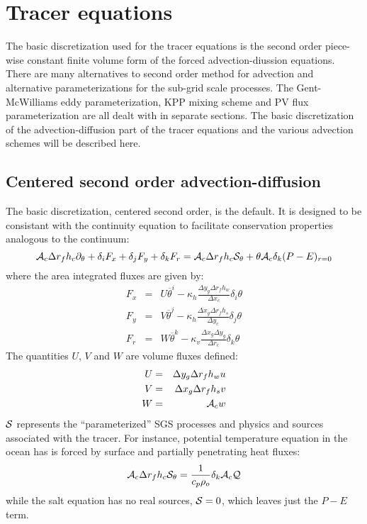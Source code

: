 
\section{Tracer equations}

The basic discretization used for the tracer equations is the second
order piece-wise constant finite volume form of the forced
advection-diussion equations. There are many alternatives to second
order method for advection and alternative parameterizations for the
sub-grid scale processes. The Gent-McWilliams eddy parameterization,
KPP mixing scheme and PV flux parameterization are all dealt with in
separate sections. The basic discretization of the advection-diffusion
part of the tracer equations and the various advection schemes will be
described here.

\subsection{Centered second order advection-diffusion}

The basic discretization, centered second order, is the default. It is
designed to be consistant with the continuity equation to facilitate
conservation properties analogous to the continuum:
\begin{equation}
{\cal A}_c \Delta r_f h_c \partial_\theta
+ \delta_i F_x
+ \delta_j F_y
+ \delta_k F_r
= {\cal A}_c \Delta r_f h_c {\cal S}_\theta
+ \theta {\cal A}_c \delta_k (P-E)_{r=0}
\end{equation}
where the area integrated fluxes are given by:
\begin{eqnarray}
F_x & = & U \overline{ \theta }^i
- \kappa_h \frac{\Delta y_g \Delta r_f h_w}{\Delta x_c} \delta_i \theta \\
F_y & = & V \overline{ \theta }^j
- \kappa_h \frac{\Delta x_g \Delta r_f h_s}{\Delta y_c} \delta_j \theta \\
F_r & = & W \overline{ \theta }^k
- \kappa_v \frac{\Delta x_g \Delta y_g}{\Delta r_c} \delta_k \theta
\end{eqnarray}
The quantities $U$, $V$ and $W$ are volume fluxes defined:
\begin{eqnarray}
U & = & \Delta y_g \Delta r_f h_w u \\
V & = & \Delta x_g \Delta r_f h_s v \\
W & = & {\cal A}_c w
\end{eqnarray}
${\cal S}$ represents the ``parameterized'' SGS processes and physics
and sources associated with the tracer. For instance, potential
temperature equation in the ocean has is forced by surface and
partially penetrating heat fluxes:
\begin{equation}
{\cal A}_c \Delta r_f h_c {\cal S}_\theta = \frac{1}{c_p \rho_o} \delta_k {\cal A}_c {\cal Q}
\end{equation}
while the salt equation has no real sources, ${\cal S}=0$, which
leaves just the $P-E$ term.


